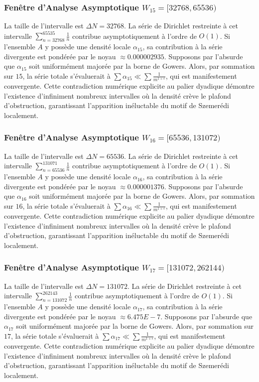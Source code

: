 \documentclass[11pt,a4paper]{article}
\begin{document}
\subsubsection{Fenêtre d'Analyse Asymptotique $W_{15} = [32768, 65536)$}
La taille de l'intervalle est $\Delta N = 32768$. La série de Dirichlet restreinte à cet intervalle $\sum_{n=32768}^{65535} \frac{1}{n}$ contribue asymptotiquement à l'ordre de $O(1)$. Si l'ensemble $A$ y possède une densité locale $\alpha_{15}$, sa contribution à la série divergente est pondérée par le noyau $\approx 0.000002935$. Supposons par l'absurde que $\alpha_{15}$ soit uniformément majorée par la borne de Gowers. Alors, par sommation sur $15$, la série totale s'évaluerait à $\sum \alpha_{15} \ll \sum \frac{1}{m^{1+\epsilon}}$, qui est manifestement convergente. Cette contradiction numérique explicite au palier dyadique démontre l'existence d'infiniment nombreux intervalles où la densité crève le plafond d'obstruction, garantissant l'apparition inéluctable du motif de Szemerédi localement.
\subsubsection{Fenêtre d'Analyse Asymptotique $W_{16} = [65536, 131072)$}
La taille de l'intervalle est $\Delta N = 65536$. La série de Dirichlet restreinte à cet intervalle $\sum_{n=65536}^{131071} \frac{1}{n}$ contribue asymptotiquement à l'ordre de $O(1)$. Si l'ensemble $A$ y possède une densité locale $\alpha_{16}$, sa contribution à la série divergente est pondérée par le noyau $\approx 0.000001376$. Supposons par l'absurde que $\alpha_{16}$ soit uniformément majorée par la borne de Gowers. Alors, par sommation sur $16$, la série totale s'évaluerait à $\sum \alpha_{16} \ll \sum \frac{1}{m^{1+\epsilon}}$, qui est manifestement convergente. Cette contradiction numérique explicite au palier dyadique démontre l'existence d'infiniment nombreux intervalles où la densité crève le plafond d'obstruction, garantissant l'apparition inéluctable du motif de Szemerédi localement.
\subsubsection{Fenêtre d'Analyse Asymptotique $W_{17} = [131072, 262144)$}
La taille de l'intervalle est $\Delta N = 131072$. La série de Dirichlet restreinte à cet intervalle $\sum_{n=131072}^{262143} \frac{1}{n}$ contribue asymptotiquement à l'ordre de $O(1)$. Si l'ensemble $A$ y possède une densité locale $\alpha_{17}$, sa contribution à la série divergente est pondérée par le noyau $\approx 6.475E-7$. Supposons par l'absurde que $\alpha_{17}$ soit uniformément majorée par la borne de Gowers. Alors, par sommation sur $17$, la série totale s'évaluerait à $\sum \alpha_{17} \ll \sum \frac{1}{m^{1+\epsilon}}$, qui est manifestement convergente. Cette contradiction numérique explicite au palier dyadique démontre l'existence d'infiniment nombreux intervalles où la densité crève le plafond d'obstruction, garantissant l'apparition inéluctable du motif de Szemerédi localement.
\end{document}
